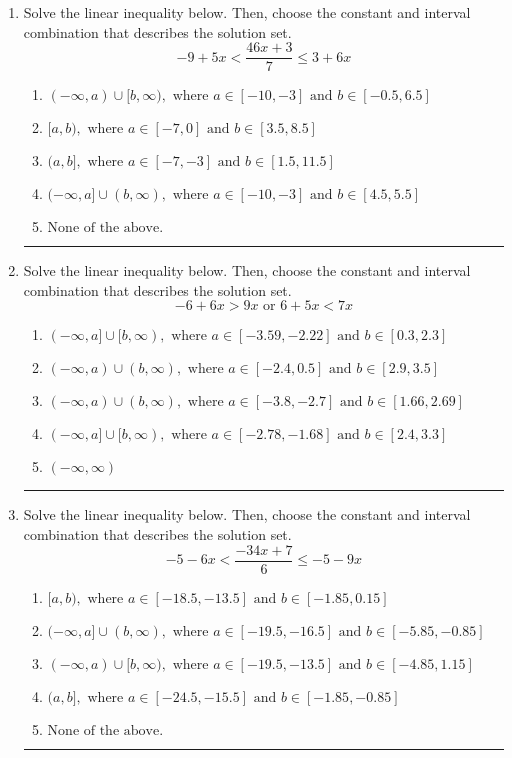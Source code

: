 \documentclass[14pt]{extbook}
\newcommand{\litem}[1]{\item#1\hspace*{-1cm}\rule{\textwidth}{0.4pt}}
\begin{document}
\begin{enumerate}
\litem{
Solve the linear inequality below. Then, choose the constant and interval combination that describes the solution set.\[ -9 + 5 x < \frac{46 x + 3}{7} \leq 3 + 6 x \]\begin{enumerate}[label=\Alph*.]
\item \( (-\infty, a) \cup [b, \infty), \text{ where } a \in [-10, -3] \text{ and } b \in [-0.5, 6.5] \)
\item \( [a, b), \text{ where } a \in [-7, 0] \text{ and } b \in [3.5, 8.5] \)
\item \( (a, b], \text{ where } a \in [-7, -3] \text{ and } b \in [1.5, 11.5] \)
\item \( (-\infty, a] \cup (b, \infty), \text{ where } a \in [-10, -3] \text{ and } b \in [4.5, 5.5] \)
\item \( \text{None of the above.} \)

\end{enumerate} }
\litem{
Solve the linear inequality below. Then, choose the constant and interval combination that describes the solution set.\[ -6 + 6 x > 9 x \text{ or } 6 + 5 x < 7 x \]\begin{enumerate}[label=\Alph*.]
\item \( (-\infty, a] \cup [b, \infty), \text{ where } a \in [-3.59, -2.22] \text{ and } b \in [0.3, 2.3] \)
\item \( (-\infty, a) \cup (b, \infty), \text{ where } a \in [-2.4, 0.5] \text{ and } b \in [2.9, 3.5] \)
\item \( (-\infty, a) \cup (b, \infty), \text{ where } a \in [-3.8, -2.7] \text{ and } b \in [1.66, 2.69] \)
\item \( (-\infty, a] \cup [b, \infty), \text{ where } a \in [-2.78, -1.68] \text{ and } b \in [2.4, 3.3] \)
\item \( (-\infty, \infty) \)

\end{enumerate} }
\litem{
Solve the linear inequality below. Then, choose the constant and interval combination that describes the solution set.\[ -5 - 6 x < \frac{-34 x + 7}{6} \leq -5 - 9 x \]\begin{enumerate}[label=\Alph*.]
\item \( [a, b), \text{ where } a \in [-18.5, -13.5] \text{ and } b \in [-1.85, 0.15] \)
\item \( (-\infty, a] \cup (b, \infty), \text{ where } a \in [-19.5, -16.5] \text{ and } b \in [-5.85, -0.85] \)
\item \( (-\infty, a) \cup [b, \infty), \text{ where } a \in [-19.5, -13.5] \text{ and } b \in [-4.85, 1.15] \)
\item \( (a, b], \text{ where } a \in [-24.5, -15.5] \text{ and } b \in [-1.85, -0.85] \)
\item \( \text{None of the above.} \)


\end{enumerate}}
\end{enumerate}
\end{document}
